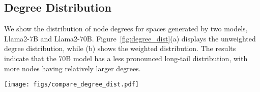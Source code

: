 \subsection{Degree Distribution}
\label{app: dd}
We show the distribution of node degrees for spaces generated by two models, Llama2-7B and Llama2-70B. Figure~\ref{fig:degree_dist}(a) displays the unweighted degree distribution, while (b) shows the weighted distribution. The results indicate that the 70B model has a less pronounced long-tail distribution, with more nodes having relatively larger degrees.

\begin{figure*}
    \centering
    \texttt{[image: figs/compare\_degree\_dist.pdf]}
    \caption{Comparison of the degree distribution for both models: (a) unweighted degree and (b) weighted degree.}
    \label{fig:degree_dist}
\end{figure*}
